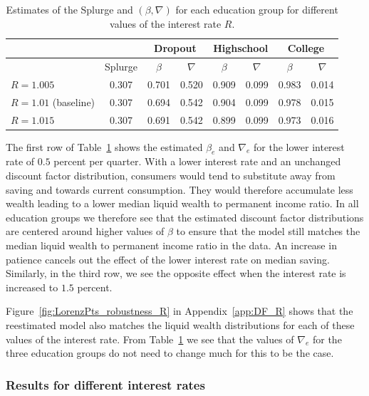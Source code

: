 \documentclass[../HAFiscal]{subfiles}
\begin{document}
\begin{table}[t]
\begin{center}
	\begin{tabular}{lc|cccccc} 
		\toprule
		& & \multicolumn{2}{c}{Dropout} & \multicolumn{2}{c}{Highschool} & \multicolumn{2}{c}{College} \\ \midrule 
		& Splurge & $\beta$ & $\nabla$ & $\beta$ & $\nabla$ & $\beta$ & $\nabla$ \\ \midrule 
		$R = 1.005$ & 0.307 & 0.701 & 0.520 & 0.909 & 0.099 & 0.983 & 0.014 \\
		$R = 1.01$ (baseline) & 0.307 & 0.694 & 0.542 & 0.904 & 0.099 & 0.978 & 0.015 \\ 
		$R = 1.015$ & 0.307 & 0.691 & 0.542 & 0.899 & 0.099 & 0.973 & 0.016 
		\\ \bottomrule 
	\end{tabular}
\end{center}
\caption{Estimates of the Splurge and $(\beta,\nabla)$ for each education group for different values of the interest rate $R$.}
\label{tab:robustness_R}
\end{table}

The first row of Table~\ref{tab:robustness_R} shows the estimated $\beta_e$ and $\nabla_e$ for the lower interest rate of $0.5$ percent per quarter. With a lower interest rate and an unchanged discount factor distribution, consumers would tend to substitute away from saving and towards current consumption. They would therefore accumulate less wealth leading to a lower median liquid wealth to permanent income ratio. In all education groups we therefore see that the estimated discount factor distributions are centered around higher values of $\beta$ to ensure that the model still matches the median liquid wealth to permanent income ratio in the data. An increase in patience cancels out the effect of the lower interest rate on median saving. Similarly, in the third row, we see the opposite effect when the interest rate is increased to $1.5$ percent.  

Figure~\ref{fig:LorenzPts_robustness_R} in Appendix~\ref{app:DF_R} shows that the reestimated model also matches the liquid wealth distributions for each of these values of the interest rate. From Table~\ref{tab:robustness_R} we see that the values of $\nabla_e$ for the three education groups do not need to change much for this to be the case. 

\FloatBarrier
\subsubsection{Results for different interest rates}
\label{sec:robust_R_results}
\end{document}
